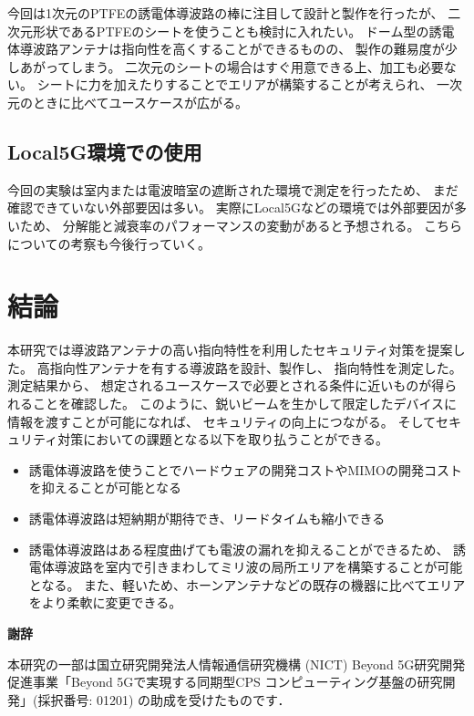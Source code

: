 \documentclass[technicalreport]{ieicej}
\begin{document}
今回は1次元のPTFEの誘電体導波路の棒に注目して設計と製作を行ったが、
二次元形状であるPTFEのシートを使うことも検討に入れたい。
ドーム型の誘電体導波路アンテナは指向性を高くすることができるものの、
製作の難易度が少しあがってしまう。
二次元のシートの場合はすぐ用意できる上、加工も必要ない。
シートに力を加えたりすることでエリアが構築することが考えられ、
一次元のときに比べてユースケースが広がる。

\subsection{Local5G環境での使用}

今回の実験は室内または電波暗室の遮断された環境で測定を行ったため、
まだ確認できていない外部要因は多い。
実際にLocal5Gなどの環境では外部要因が多いため、
分解能と減衰率のパフォーマンスの変動があると予想される。
こちらについての考察も今後行っていく。

\section{結論}

本研究では導波路アンテナの高い指向特性を利用したセキュリティ対策を提案した。
高指向性アンテナを有する導波路を設計、製作し、
指向特性を測定した。
測定結果から、
想定されるユースケースで必要とされる条件に近いものが得られることを確認した。
このように、鋭いビームを生かして限定したデバイスに情報を渡すことが可能になれば、
セキュリティの向上につながる。
そしてセキュリティ対策においての課題となる以下を取り払うことができる。

\begin{itemize}
  \item 誘電体導波路を使うことでハードウェアの開発コストやMIMOの開発コストを抑えることが可能となる
  \item 誘電体導波路は短納期が期待でき、リードタイムも縮小できる
  \item 誘電体導波路はある程度曲げても電波の漏れを抑えることができるため、
  誘電体導波路を室内で引きまわしてミリ波の局所エリアを構築することが可能となる。
  また、軽いため、ホーンアンテナなどの既存の機器に比べてエリアをより柔軟に変更できる。
\end{itemize}

\begin{center}
  \Large \textbf{謝辞}
\end{center}

本研究の一部は国立研究開発法人情報通信研究機構 (NICT) 
Beyond 5G研究開発促進事業「Beyond 5Gで実現する同期型CPS
コンピューティング基盤の研究開発」(採択番号: 01201) の助成を受けたものです．

%
%

\end{document}
